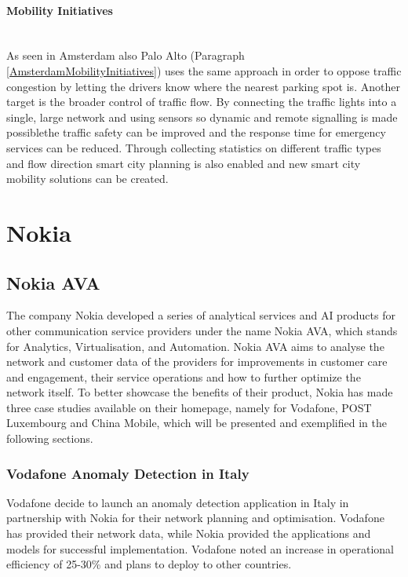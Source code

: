 \documentclass[a4paper,12pt]{report}
\begin{document}
		\paragraph{Mobility Initiatives} \hfill \\
		As seen in Amsterdam also Palo Alto (Paragraph \ref{AmsterdamMobilityInitiatives}) uses the same approach in order to oppose traffic congestion by letting the drivers know where the nearest parking spot is. Another target is the broader control of traffic flow. By connecting the traffic lights into a single, large network and using sensors so dynamic and remote signalling is made possiblethe traffic safety can be improved and the response time for emergency services can be reduced. Through collecting statistics on different traffic types and flow direction smart city planning is also enabled and new smart city mobility solutions can be created.
	\closesection
	
	\section{Nokia}
	\startsection
		\subsection[Nokia AVA]{Nokia AVA \cite{NokiaAVACrowdAnalytics}}
		\startsubsection
			The company Nokia developed a series of analytical services and AI products for other communication service providers under the name Nokia AVA, which stands for Analytics, Virtualisation, and Automation. Nokia AVA aims to analyse the network and customer data of the providers for improvements in customer care and engagement, their service operations and how to further optimize the network itself.
			To better showcase the benefits of their product, Nokia has made three case studies available on their homepage, namely for Vodafone, POST Luxembourg and China Mobile, which will be presented and exemplified in the following sections.
			\subsubsection{Vodafone Anomaly Detection in Italy}
				Vodafone decide to launch an anomaly detection application in Italy in partnership with Nokia for their network planning and optimisation. Vodafone has provided their network data, while Nokia provided the applications and models for successful implementation. Vodafone noted an increase in operational efficiency of 25-30\% and plans to deploy to other countries.	
\end{document}
